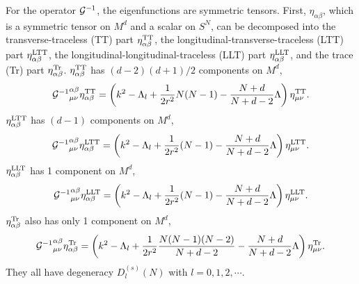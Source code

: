 \documentclass[a4paper,aps,preprint,groupedaddress,showpacs]{revtex4}
\begin{document}
For the operator ${\cal G}^{-1}$, the eigenfunctions are
symmetric tensors. First, $\eta_{\alpha\beta}$, which is a 
symmetric tensor on $M^{d}$ and a scalar on $S^{N}$, can
be decomposed \cite{RO} 
into the transverse-traceless (TT) part
$\eta^{\rm TT}_{\alpha\beta}$, the 
longitudinal-transverse-traceless (LTT) part 
$\eta^{\rm LTT}_{\alpha\beta}$, the 
longitudinal-longitudinal-traceless (LLT) part
$\eta^{\rm LLT}_{\alpha\beta}$, and the
trace (Tr) part $\eta^{\rm Tr}_{\alpha\beta}$. 
$\eta^{\rm TT}_{\alpha\beta}$ has $(d-2)(d+1)/2$ components on 
$M^{d}$,
\begin{equation}
{{\cal G}^{-1}}^{\alpha\beta}_{\mu\nu}\eta^{\rm TT}_{\alpha\beta}=
\left(k^{2}-\Lambda_{l}+\frac{1}{2r^{2}}N(N-1)-
\frac{N+d}{N+d-2}\Lambda\right)\eta^{\rm TT}_{\mu\nu}.
\end{equation}
$\eta^{\rm LTT}_{\alpha\beta}$ has $(d-1)$ components
on $M^{d}$,
\begin{equation}
{{\cal G}^{-1}}^{\alpha\beta}_{\mu\nu}\eta^{\rm LTT}_{\alpha\beta}=
\left(k^{2}-\Lambda_{l}+\frac{1}{2r^{2}}(N-1)-
\frac{N+d}{N+d-2}\Lambda\right)\eta^{\rm LTT}_{\mu\nu}.
\end{equation}
$\eta^{\rm LLT}_{\alpha\beta}$ has 1 component on $M^{d}$,
\begin{equation}
{{\cal G}^{-1}}^{\alpha\beta}_{\mu\nu}\eta^{\rm LLT}_{\alpha\beta}=
\left(k^{2}-\Lambda_{l}+\frac{1}{2r^{2}}(N-1)-
\frac{N+d}{N+d-2}\Lambda\right)\eta^{\rm LLT}_{\mu\nu}.
\end{equation}
$\eta^{\rm Tr}_{\alpha\beta}$ also has only 1 component on $M^{d}$,
\begin{equation}
{{\cal G}^{-1}}^{\alpha\beta}_{\mu\nu}\eta^{\rm Tr}_{\alpha\beta}=
\left(k^{2}-\Lambda_{l}+\frac{1}{2r^{2}}
\frac{N(N-1)(N-2)}{N+d-2}-\frac{N+d}{N+d-2}\Lambda\right)
\eta^{\rm Tr}_{\mu\nu}.
\end{equation}
They all have degeneracy $D^{(s)}_{l}(N)$ with $l=0,1,2,\cdots$.
\end{document}
